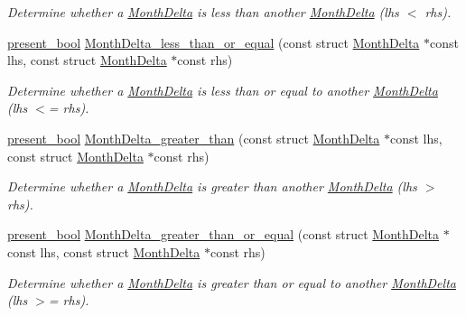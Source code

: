 \begin{DoxyCompactItemize}
\begin{DoxyCompactList}\small\item\em Determine whether a \hyperlink{structMonthDelta}{Month\-Delta} is less than another \hyperlink{structMonthDelta}{Month\-Delta} (lhs $<$ rhs). \end{DoxyCompactList}\item 
\hyperlink{types_8h_a1c24e2cdd988b886e889080ded176ae0}{present\-\_\-bool} \hyperlink{month-delta_8h_a6f360c9e40307f6643c309ccc66fb5a5}{Month\-Delta\-\_\-less\-\_\-than\-\_\-or\-\_\-equal} (const struct \hyperlink{structMonthDelta}{Month\-Delta} $\ast$const lhs, const struct \hyperlink{structMonthDelta}{Month\-Delta} $\ast$const rhs)
\begin{DoxyCompactList}\small\item\em Determine whether a \hyperlink{structMonthDelta}{Month\-Delta} is less than or equal to another \hyperlink{structMonthDelta}{Month\-Delta} (lhs $<$= rhs). \end{DoxyCompactList}\item 
\hyperlink{types_8h_a1c24e2cdd988b886e889080ded176ae0}{present\-\_\-bool} \hyperlink{month-delta_8h_a8bdc5fd7fb7fb5168163046902ff219b}{Month\-Delta\-\_\-greater\-\_\-than} (const struct \hyperlink{structMonthDelta}{Month\-Delta} $\ast$const lhs, const struct \hyperlink{structMonthDelta}{Month\-Delta} $\ast$const rhs)
\begin{DoxyCompactList}\small\item\em Determine whether a \hyperlink{structMonthDelta}{Month\-Delta} is greater than another \hyperlink{structMonthDelta}{Month\-Delta} (lhs $>$ rhs). \end{DoxyCompactList}\item 
\hyperlink{types_8h_a1c24e2cdd988b886e889080ded176ae0}{present\-\_\-bool} \hyperlink{month-delta_8h_ad31b71629077ae015d463e9f9193f767}{Month\-Delta\-\_\-greater\-\_\-than\-\_\-or\-\_\-equal} (const struct \hyperlink{structMonthDelta}{Month\-Delta} $\ast$const lhs, const struct \hyperlink{structMonthDelta}{Month\-Delta} $\ast$const rhs)
\begin{DoxyCompactList}\small\item\em Determine whether a \hyperlink{structMonthDelta}{Month\-Delta} is greater than or equal to another \hyperlink{structMonthDelta}{Month\-Delta} (lhs $>$= rhs). \end{DoxyCompactList}\end{DoxyCompactItemize}


